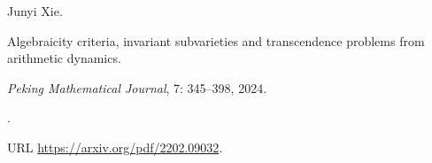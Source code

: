Junyi Xie.

\newblock Algebraicity criteria, invariant subvarieties and transcendence
  problems from arithmetic dynamics.

\newblock \emph{Peking Mathematical Journal}, 7: 345--398, 2024.

\newblock {}.

\newblock URL \url{https://arxiv.org/pdf/2202.09032}.
